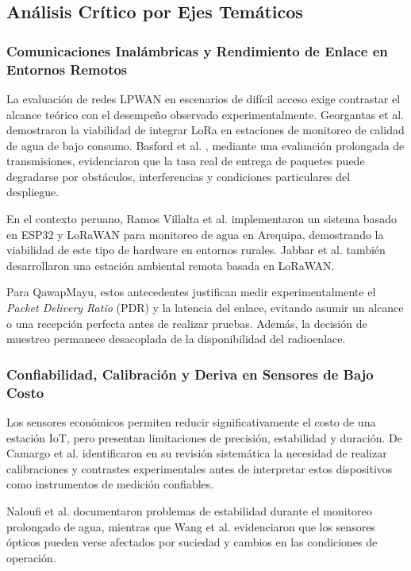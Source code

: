 \documentclass[11pt,a4paper]{article}
\begin{document}
\subsection{Análisis Crítico por Ejes Temáticos}

\subsubsection{Comunicaciones Inalámbricas y Rendimiento de Enlace en Entornos Remotos}

La evaluación de redes LPWAN en escenarios de difícil acceso exige contrastar el alcance teórico con el desempeño observado experimentalmente. Georgantas et al. \cite{georgantas} demostraron la viabilidad de integrar LoRa en estaciones de monitoreo de calidad de agua de bajo consumo. Basford et al. \cite{basford}, mediante una evaluación prolongada de transmisiones, evidenciaron que la tasa real de entrega de paquetes puede degradarse por obstáculos, interferencias y condiciones particulares del despliegue.

En el contexto peruano, Ramos Villalta et al. \cite{ramos} implementaron un sistema basado en ESP32 y LoRaWAN para monitoreo de agua en Arequipa, demostrando la viabilidad de este tipo de hardware en entornos rurales. Jabbar et al. \cite{jabbar} también desarrollaron una estación ambiental remota basada en LoRaWAN.

Para QawapMayu, estos antecedentes justifican medir experimentalmente el \textit{Packet Delivery Ratio} (PDR) y la latencia del enlace, evitando asumir un alcance o una recepción perfecta antes de realizar pruebas. Además, la decisión de muestreo permanece desacoplada de la disponibilidad del radioenlace.

\subsubsection{Confiabilidad, Calibración y Deriva en Sensores de Bajo Costo}

Los sensores económicos permiten reducir significativamente el costo de una estación IoT, pero presentan limitaciones de precisión, estabilidad y duración. De Camargo et al. \cite{camargo} identificaron en su revisión sistemática la necesidad de realizar calibraciones y contrastes experimentales antes de interpretar estos dispositivos como instrumentos de medición confiables.

Naloufi et al. \cite{naloufi} documentaron problemas de estabilidad durante el monitoreo prolongado de agua, mientras que Wang et al. \cite{wang} evidenciaron que los sensores ópticos pueden verse afectados por suciedad y cambios en las condiciones de operación.
\end{document}
